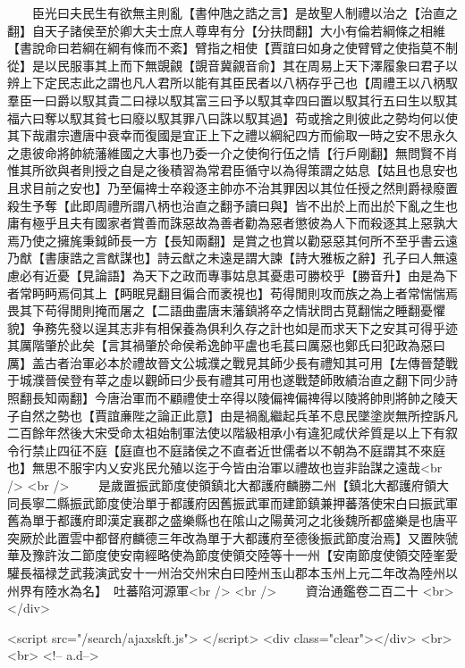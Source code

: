 　　臣光曰夫民生有欲無主則亂【書仲虺之誥之言】是故聖人制禮以治之【治直之翻】自天子諸侯至於卿大夫士庶人尊卑有分【分扶問翻】大小有倫若綱條之相維【書說命曰若綱在綱有條而不紊】臂指之相使【賈誼曰如身之使臂臂之使指莫不制從】是以民服事其上而下無覬覦【覬音冀覦音俞】其在周易上天下澤履象曰君子以辨上下定民志此之謂也凡人君所以能有其臣民者以八柄存乎己也【周禮王以八柄馭羣臣一曰爵以馭其貴二曰禄以馭其富三曰予以馭其幸四曰置以馭其行五曰生以馭其福六曰奪以馭其貧七曰廢以馭其罪八曰誅以馭其過】苟或捨之則彼此之勢均何以使其下哉肅宗遭唐中衰幸而復國是宜正上下之禮以綱紀四方而偷取一時之安不思永久之患彼命將帥統藩維國之大事也乃委一介之使徇行伍之情【行戶剛翻】無問賢不肖惟其所欲與者則授之自是之後積習為常君臣循守以為得策謂之姑息【姑且也息安也且求目前之安也】乃至偏禆士卒殺逐主帥亦不治其罪因以其位任授之然則爵禄廢置殺生予奪【此即周禮所謂八柄也治直之翻予讀曰與】皆不出於上而出於下亂之生也庸有極乎且夫有國家者賞善而誅惡故為善者勸為惡者懲彼為人下而殺逐其上惡孰大焉乃使之擁旄秉鉞師長一方【長知兩翻】是賞之也賞以勸惡惡其何所不至乎書云遠乃猷【書康誥之言猷謀也】詩云猷之未遠是謂大諫【詩大雅板之辭】孔子曰人無遠慮必有近憂【見論語】為天下之政而專事姑息其憂患可勝校乎【勝音升】由是為下者常眄眄焉伺其上【眄眠見翻目徧合而袤視也】苟得閒則攻而族之為上者常惴惴焉畏其下苟得閒則掩而屠之【二語曲盡唐末藩鎮將卒之情狀問古莧翻惴之睡翻憂懼貌】争務先發以逞其志非有相保養為俱利久存之計也如是而求天下之安其可得乎迹其厲階肇於此矣【言其禍肇於命侯希逸帥平盧也毛萇曰厲惡也鄭氏曰犯政為惡曰厲】盖古者治軍必本於禮故晉文公城濮之戰見其師少長有禮知其可用【左傳晉楚戰于城濮晉侯登有莘之虛以觀師曰少長有禮其可用也遂戰楚師敗績治直之翻下同少詩照翻長知兩翻】今唐治軍而不顧禮使士卒得以陵偏禆偏禆得以陵將帥則將帥之陵天子自然之勢也【賈誼亷陛之論正此意】由是禍亂繼起兵革不息民墜塗炭無所控訴凡二百餘年然後大宋受命太祖始制軍法使以階級相承小有違犯咸伏斧質是以上下有叙令行禁止四征不庭【庭直也不庭諸侯之不直者近世儒者以不朝為不庭謂其不來庭也】無思不服宇内乂安兆民允殖以迄于今皆由治軍以禮故也豈非詒謀之遠哉<br />
<br />
　　是歲置振武節度使領鎮北大都護府麟勝二州【鎮北大都護府領大同長寧二縣振武節度使治單于都護府因舊振武軍而建節鎮兼押蕃落使宋白曰振武軍舊為單于都護府即漢定襄郡之盛樂縣也在隂山之陽黄河之北後魏所都盛樂是也唐平突厥於此置雲中都督府麟德三年改為單于大都護府至德後振武節度治焉】又置陜虢華及豫許汝二節度使安南經略使為節度使領交陸等十一州【安南節度使領交陸峯愛驩長福禄芝武莪演武安十一州治交州宋白曰陸州玉山郡本玉州上元二年改為陸州以州界有陸水為名】　吐蕃陷河源軍<br />
<br />
　　資治通鑑卷二百二十  <br>
   </div> 

<script src="/search/ajaxskft.js"> </script>
 <div class="clear"></div>
<br>
<br>
 <!-- a.d-->

